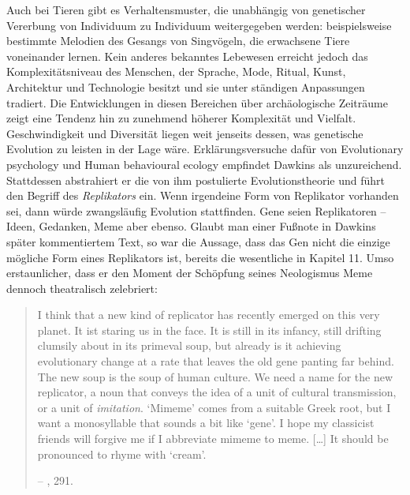 \documentclass[openany,twoside,twocolumn]{book}
\begin{document}
Auch bei Tieren gibt es Verhaltensmuster, die unabhängig von genetischer
Vererbung von Individuum zu Individuum weitergegeben werden:
beispielsweise bestimmte Melodien des Gesangs von Singvögeln, die
erwachsene Tiere voneinander lernen. Kein anderes bekanntes Lebewesen
erreicht jedoch das Komplexitätsniveau des Menschen, der Sprache, Mode,
Ritual, Kunst, Architektur und Technologie besitzt und sie unter
ständigen Anpassungen tradiert. Die Entwicklungen in diesen Bereichen
über archäologische Zeiträume zeigt eine Tendenz hin zu zunehmend
höherer Komplexität und Vielfalt. Geschwindigkeit und Diversität liegen
weit jenseits dessen, was genetische Evolution zu leisten in der Lage
wäre. Erklärungsversuche dafür von Evolutionary psychology und Human
behavioural ecology empfindet Dawkins als unzureichend. Stattdessen
abstrahiert er die von ihm postulierte Evolutionstheorie und führt den
Begriff des \emph{Replikators} ein. Wenn irgendeine Form von Replikator
vorhanden sei, dann würde zwangsläufig Evolution stattfinden. Gene seien
Replikatoren -- Ideen, Gedanken, Meme aber ebenso. Glaubt man einer
Fußnote in Dawkins später kommentiertem Text, so war die Aussage, dass
das Gen nicht die einzige mögliche Form eines Replikators ist, bereits
die wesentliche in Kapitel 11. Umso erstaunlicher, dass er den Moment
der Schöpfung seines Neologismus Meme dennoch theatralisch zelebriert:

\begin{quote}
I think that a new kind of replicator has recently emerged on this very
planet. It ist staring us in the face. It is still in its infancy, still
drifting clumsily about in its primeval soup, but already is it
achieving evolutionary change at a rate that leaves the old gene panting
far behind. The new soup is the soup of human culture. We need a name
for the new replicator, a noun that conveys the idea of a unit of
cultural transmission, or a unit of \emph{imitation}. `Mimeme' comes
from a suitable Greek root, but I want a monosyllable that sounds a bit
like `gene'. I hope my classicist friends will forgive me if I
abbreviate mimeme to meme. {[}\ldots{}{]} It should be pronounced to
rhyme with `cream'.

-- \textcite{Dawkinsselfishgene40th2016}, 291.
\end{quote}
\end{document}
